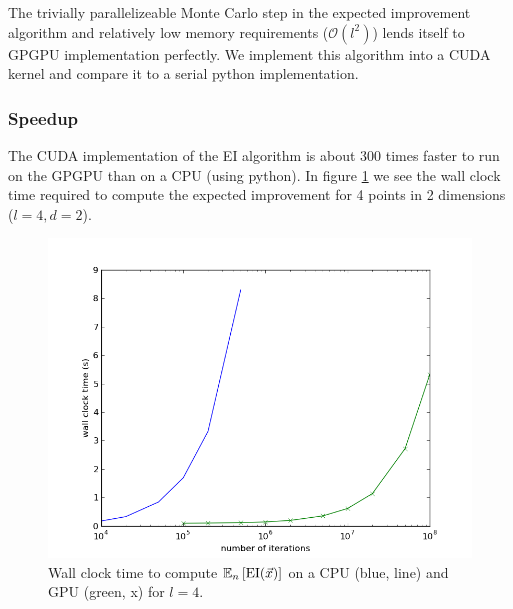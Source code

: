 \documentclass[phd,tocprelim]{cornell}
\begin{document}
The trivially parallelizeable Monte Carlo step in the expected improvement algorithm and relatively low memory requirements ($\mathcal{O}(l^{2})$) lends itself to GPGPU implementation perfectly. We implement this algorithm into a CUDA kernel and compare it to a serial python implementation.

%
%

\subsubsection{Speedup}

The CUDA implementation of the EI algorithm is about 300 times faster to run on the GPGPU than on a CPU (using python). In figure \ref{GPUspeed1} we see the wall clock time required to compute the expected improvement for 4 points in 2 dimensions ($l=4, d=2$).

 \begin{figure}[hpt]
 	\centerline{\includegraphics[width=\textwidth]{figures/EPI/exp_EI_speedup_vs_its.png}}
    \caption[CPU vs GPU time to compute EI]{Wall clock time to compute $\mathbb{E}_{n}\left[{\rm EI}(\vec{x})\right]$ on a CPU (blue, line) and GPU (green, x) for $l = 4$.}
 	\label{GPUspeed1}
 \end{figure}
\end{document}
